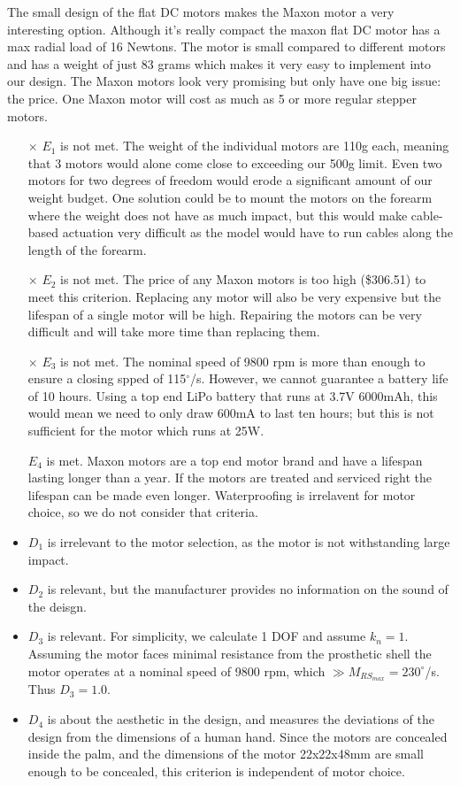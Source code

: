 \documentclass[12pt,3p]{report}
\begin{document}
\begin{multicols}{2}
		The small design of the flat DC motors makes the Maxon motor a very interesting option. Although it's really compact the maxon flat DC motor has a max radial load of 16 Newtons. The motor is small compared to different motors and has a weight of just 83 grams which makes it very easy to implement into our design. The Maxon motors look very promising but only have one big issue: the price. One Maxon motor will cost as much as 5 or more regular stepper motors. 

		\begin{itemize}
		    \item[$\times$] $E_1$ is not met. The weight of the individual motors are 110g each, meaning that 3 motors would alone come close to exceeding our 500g limit. Even two motors for two degrees of freedom would erode a significant amount of our weight budget. One solution could be to mount the motors on the forearm where the weight does not have as much impact, but this would make cable-based actuation very difficult as the model would have to run cables along the length of the forearm.
		    \item[$\times$] $E_2$ is not met. The price of any Maxon motors is too high (\$306.51) to meet this criterion. Replacing any motor will also be very expensive but the lifespan of a single motor will be high. Repairing the motors can be very difficult and will take more time than replacing them.
		    \item[$\times$] $E_3$ is not met. The nominal speed of 9800 rpm is more than enough to ensure a closing spped of 115$^{\circ}$/s. However, we cannot guarantee a battery life of 10 hours. Using a top end LiPo battery that runs at 3.7V 6000mAh, this would mean we need to only draw 600mA to last ten hours; but this is not sufficient for the motor which runs at 25W.
		    \item[\checkmark] $E_4$ is met. Maxon motors are a top end motor brand and have a lifespan lasting longer than a year.  If the motors are treated and serviced right the lifespan can be made even longer. Waterproofing is irrelavent for motor choice, so we do not consider that criteria.
		    \item $D_1$ is irrelevant to the motor selection, as the motor is not withstanding large impact.
		    \item $D_2$ is relevant, but the manufacturer provides no information on the sound of the deisgn.
		    \item $D_3$ is relevant. For simplicity, we calculate 1 DOF and assume $k_n = 1$. Assuming the motor faces minimal resistance from the prosthetic shell the motor operates at a nominal speed of 9800 rpm, which $\gg M_{RS_{max}}= 230^\circ$/s. Thus $D_3 = 1.0$.
		    \item $D_4$ is about the aesthetic in the design, and measures the deviations of the design from the dimensions of a
		    human hand. Since the motors are concealed inside the palm, and the dimensions of the motor 22x22x48mm are small enough to be concealed, this criterion is independent of motor choice.


\end{itemize}
\end{multicols}
\end{document}
